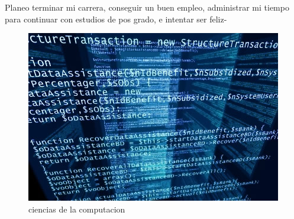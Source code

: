 Planeo terminar mi carrera, conseguir un buen empleo, administrar mi tiempo para continuar con estudios de pos grado, e intentar ser feliz-

\begin{figure}[h]
  \centering
  \includegraphics[scale=0.5]{IMG/19_3.jpg}
  \caption{ciencias de la computacion}
  \label{fig:computo}
\end{figure}




